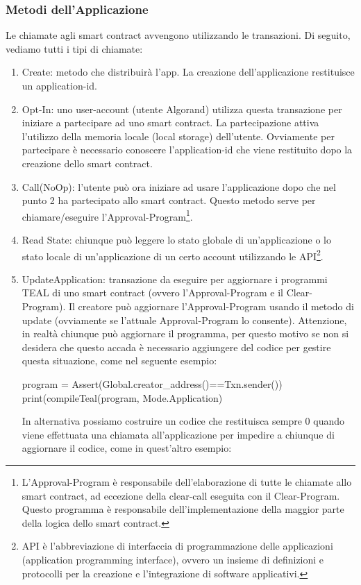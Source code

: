 \subsubsection{Metodi dell'Applicazione}
Le chiamate agli smart contract avvengono utilizzando le transazioni. Di seguito, vediamo tutti i tipi di chiamate:
\begin{enumerate}
    \item Create: metodo che distribuirà l'app. La creazione dell'applicazione restituisce un application-id.
    \item Opt-In: uno user-account (utente Algorand) utilizza questa transazione per iniziare a partecipare ad uno smart contract. La partecipazione attiva l'utilizzo della memoria locale (local storage) dell'utente. Ovviamente per partecipare è necessario conoscere l'application-id che viene restituito dopo la creazione dello smart contract.
    \item Call(NoOp): l'utente può ora iniziare ad usare l'applicazione dopo che nel punto 2 ha partecipato allo smart contract. Questo metodo serve per chiamare/eseguire l'Approval-Program\footnote{L'Approval-Program è responsabile dell'elaborazione di tutte le chiamate allo smart contract, ad eccezione della clear-call eseguita con il Clear-Program. Questo programma è responsabile dell'implementazione della maggior parte della logica dello smart contract.}.
    \item Read State: chiunque può leggere lo stato globale di un'applicazione o lo stato locale di un'applicazione di un certo account utilizzando le API\footnote{API è l'abbreviazione di interfaccia di programmazione delle applicazioni (application programming interface), ovvero un insieme di definizioni e protocolli per la creazione e l'integrazione di software applicativi.}.
    \item UpdateApplication: transazione da eseguire per aggiornare i programmi TEAL di uno smart contract (ovvero l'Approval-Program e il Clear-Program). Il creatore può aggiornare l'Approval-Program usando il metodo di update (ovviamente se l'attuale Approval-Program lo consente). Attenzione, in realtà chiunque può aggiornare il programma, per questo motivo se non si desidera che questo accada è necessario aggiungere del codice per gestire questa situazione, come nel seguente esempio:
    
    \begin{pythoncode}
    program = Assert(Global.creator_address()==Txn.sender())
    print(compileTeal(program, Mode.Application)
    \end{pythoncode}
    In alternativa possiamo costruire un codice che restituisca sempre 0 quando viene effettuata una chiamata all'applicazione per impedire a chiunque di aggiornare il codice, come in quest'altro esempio:


\end{enumerate}

